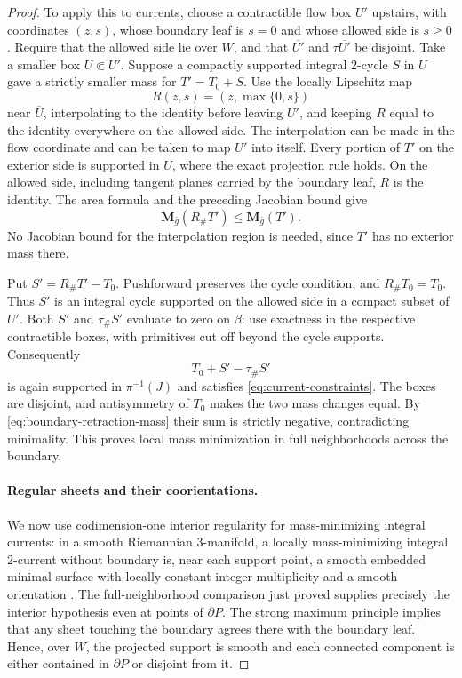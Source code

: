 \begin{proof}
To apply this to currents, choose a contractible flow box $U'$ upstairs,
with coordinates $(z,s)$, whose boundary leaf is $s=0$ and whose allowed
side is $s\geq0$. Require that the allowed side lie over $W$, and that
$\overline{U'}$ and $\tau\overline{U'}$ be disjoint. Take a smaller
box $U\Subset U'$. Suppose a compactly supported integral $2$-cycle
$S$ in $U$ gave a strictly smaller mass for $T'=T_0+S$. Use the
locally Lipschitz map
\[
R(z,s)=(z,\max\{0,s\})
\]
near $\overline U$, interpolating to the identity before leaving $U'$,
and keeping $R$ equal to the identity everywhere on the allowed side.
The interpolation can be made in the flow coordinate and can be taken
to map $U'$ into itself. Every portion of $T'$ on the exterior side is
supported in $U$, where the exact projection rule holds. On the allowed
side, including tangent planes carried by the boundary leaf, $R$ is
the identity. The area formula and the preceding Jacobian bound give
\begin{equation}\label{eq:boundary-retraction-mass}
\mathbf M_{\bar g}(R_\#T')\leq \mathbf M_{\bar g}(T').
\end{equation}
No Jacobian bound for the interpolation region is needed, since $T'$
has no exterior mass there.

Put $S'=R_\#T'-T_0$. Pushforward preserves the cycle condition, and
$R_\#T_0=T_0$. Thus $S'$ is an integral cycle supported on the allowed
side in a compact subset of $U'$. Both $S'$ and $\tau_\#S'$ evaluate
to zero on $\beta$: use exactness in the respective contractible boxes,
with primitives cut off beyond the cycle supports. Consequently
\[
T_0+S'-\tau_\#S'
\]
is again supported in $\pi^{-1}(J)$ and satisfies
\eqref{eq:current-constraints}. The boxes are disjoint, and antisymmetry
of $T_0$ makes the two mass changes equal. By
\eqref{eq:boundary-retraction-mass} their sum is strictly negative,
contradicting minimality. This proves local mass minimization in full
neighborhoods across the boundary.

\paragraph{Regular sheets and their coorientations.}
We now use codimension-one interior regularity for mass-minimizing
integral currents: in a smooth Riemannian $3$-manifold, a locally
mass-minimizing integral $2$-current without boundary is, near each
support point, a smooth embedded minimal surface with locally constant
integer multiplicity and a smooth orientation
\cite[Chapter~7, Section~5]{Simon2014}. The full-neighborhood
comparison just proved supplies precisely the interior hypothesis even
at points of $\partial P$. The strong maximum principle implies that
any sheet touching the boundary agrees there with the boundary leaf.
Hence, over $W$, the projected support is smooth and each connected
component is either contained in $\partial P$ or disjoint from it.


\end{proof}
